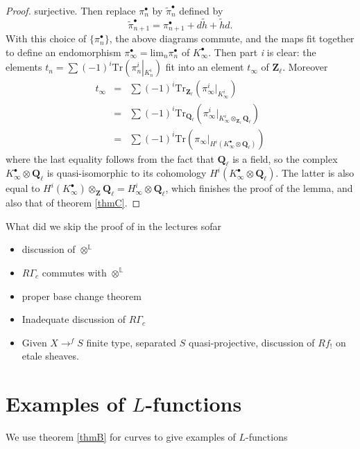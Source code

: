 \begin{proof}
surjective. Then replace $\pi_n^\bullet$ by $\tilde\pi_n^\bullet$ defined by 
$$
\tilde\pi_{n+1}^\bullet = \pi_{n+1}^\bullet +  d\tilde h+\tilde hd.
$$
With this choice of $\{\pi_n^\bullet\}$, the above diagrams commute, and the 
maps fit together to define an endomorphism $\pi_\infty^\bullet = 
\text{lim}_n\pi_n^\bullet$ of $K_\infty^\bullet$. Then part {\it i} is clear: 
the elements $t_n = \sum(-1)^i 
\text{Tr}\left(\pi_n^i\left|_{K_n^i}\right.\right)$ fit into an element 
$t_\infty$ of $\mathbf{Z}_\ell$. Moreover
\begin{eqnarray*}
t_\infty & = & \sum(-1)^i 
\text{Tr}_{\mathbf{Z}_\ell}\left(\pi_\infty^i\big|_{K_\infty^i}\right) \\
& = & \sum(-1)^i 
\text{Tr}_{\mathbf{Q}_\ell}\left(\pi_\infty^i\big|_{K_\infty^i\otimes_{\mathbf{Z
}_\ell}\mathbf{Q}_\ell}\right)\\
& = 
&\sum(-1)^i\text{Tr}\left(\pi_\infty\big|_{H^i(K_\infty^\bullet\otimes\mathbf{Q}
_\ell)}\right)
\end{eqnarray*}
where the last equality follows from the fact that $\mathbf{Q}_\ell$ is a 
field, so the complex $K_\infty^\bullet\otimes\mathbf{Q}_\ell$ is 
quasi-isomorphic to its cohomology 
$H^i(K_\infty^\bullet\otimes\mathbf{Q}_\ell)$. The latter is also equal to 
$H^i(K_\infty^\bullet)\otimes_{\mathbf{Z}}\mathbf{Q}_\ell = H_\infty^i\otimes 
\mathbf{Q}_\ell$, which finishes the proof of the lemma, and also that of 
theorem \ref{thmC}.
\end{proof}

\noindent
What did we skip the proof of in the lectures sofar
\begin{itemize}
\item discussion of $\otimes^{\mathbb{L}}$
\item $R\Gamma_c$ commutes with $\otimes^{\mathbb L}$ 
\item proper base change theorem
\item Inadequate discussion of $R\Gamma_c$
\item Given $X\to^f S$ finite type, separated $S$ quasi-projective, discussion 
of $Rf_!$ on etale sheaves. 
\end{itemize}


\section{Examples of $L$-functions} 

We use theorem \ref{thmB} for curves to give examples of $L$-functions

